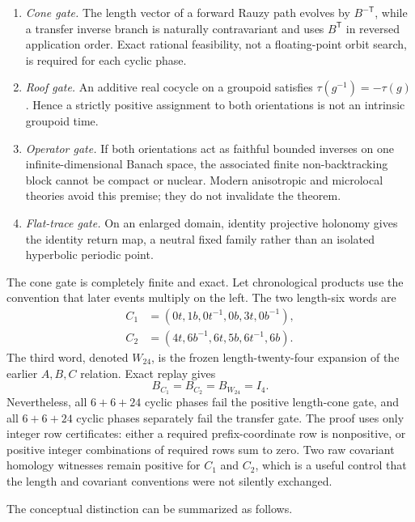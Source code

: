 \begin{enumerate}[label=(G\arabic*),leftmargin=2.6em]
\item \emph{Cone gate.}  The length vector of a forward Rauzy path evolves by
  $B^{-\mathsf T}$, while a transfer inverse branch is naturally
  contravariant and uses $B^{\mathsf T}$ in reversed application order.
  Exact rational feasibility, not a floating-point orbit search, is required
  for each cyclic phase.
\item \emph{Roof gate.}  An additive real cocycle on a groupoid satisfies
  $\tau(g^{-1})=-\tau(g)$.  Hence a strictly positive assignment to both
  orientations is not an intrinsic groupoid time.
\item \emph{Operator gate.}  If both orientations act as faithful bounded
  inverses on one infinite-dimensional Banach space, the associated finite
  non-backtracking block cannot be compact or nuclear.  Modern anisotropic
  and microlocal theories avoid this premise; they do not invalidate the
  theorem.
\item \emph{Flat-trace gate.}  On an enlarged domain, identity projective
  holonomy gives the identity return map, a neutral fixed family rather than
  an isolated hyperbolic periodic point.
\end{enumerate}

The cone gate is completely finite and exact.  Let chronological products
use the convention that later events multiply on the left.  The two
length-six words are
\begin{align*}
C_1&=(0t,1b,0t^{-1},0b,3t,0b^{-1}),\\
C_2&=(4t,6b^{-1},6t,5b,6t^{-1},6b).
\end{align*}
The third word, denoted $W_{24}$, is the frozen length-twenty-four expansion
of the earlier $A,B,C$ relation.  Exact replay gives
\[
B_{C_1}=B_{C_2}=B_{W_{24}}=I_4.
\]
Nevertheless, all $6+6+24$ cyclic phases fail the positive length-cone gate,
and all $6+6+24$ cyclic phases separately fail the transfer gate.  The proof
uses only integer row certificates: either a required prefix-coordinate row
is nonpositive, or positive integer combinations of required rows sum to
zero.  Two raw covariant homology witnesses remain positive for $C_1$ and
$C_2$, which is a useful control that the length and covariant conventions
were not silently exchanged.

The conceptual distinction can be summarized as follows.

